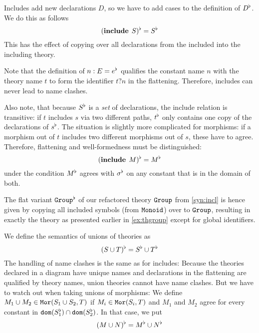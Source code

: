 \begin{example}\label{sem:incl}
Includes add new declarations $D$, so we have to add cases to the definition of $D^{\flat}$.
We do this as follows
  \[(\operatorname{\mathbf{include}}{\;S})^{\flat} = S^\flat\]
This has the effect of copying over all declarations from the included into the including theory.

Note that the definition of $n:E=e^{\flat}$ qualifies the constant name $n$ with the theory name $t$ to form the identifier $t?n$ in the flattening.
Therefore, includes can never lead to name clashes.

Also note, that because $S^\flat$ is a \textit{set} of declarations, the include relation is transitive: if $t$ includes $s$ via two different paths, $t^\flat$ only contains one copy of the declarations of $s^\flat$.
The situation is slightly more complicated for morphisms: if a morphism out of $t$ includes two different morphisms out of $s$, these have to agree.
Therefore, flattening and well-formedness must be distinguished:
  \[(\operatorname{\mathbf{include}}{\;M})^{\flat} = M^\flat\]
under the condition $M^\flat$ agrees with $\sigma^\flat$ on any constant that is in the domain of both.

The flat variant $\operatorname{\mathtt{Group}}^\flat$ of our refactored theory $\operatorname{\mathtt{Group}}$ from \autoref{syn:incl} is hence given by copying all included symbols (from $\operatorname{\mathtt{Monoid}}$) over to $\operatorname{\mathtt{Group}}$, resulting in exactly the theory as presented earlier in \autoref{ex:thgroup} except for global identifiers.
\end{example}

\begin{union}
\begin{example}\label{sem:union}
We define the semantics of unions of theories as
\[(S\cup T)^\flat=S^\flat\cup T^\flat\]
The handling of name clashes is the same as for includes:
Because the theories declared in a diagram have unique names and declarations in the flattening are qualified by theory names, union theories cannot have name clashes.
But we have to watch out when taking unions of morphisms:
We define $M_1\cup M_2\in \mathtt{Mor}(S_1\cup S_2,T)$ if $M_i\in\mathtt{Mor}(S_i,T)$ and $M_1$ and $M_2$ agree for every constant in $\mathtt{dom}(S_1^\flat)\cap\mathtt{dom}(S_2^\flat)$.
In that case, we put
\[(M\cup N)^\flat=M^\flat\cup N^\flat\]
\end{example}
\end{union}


